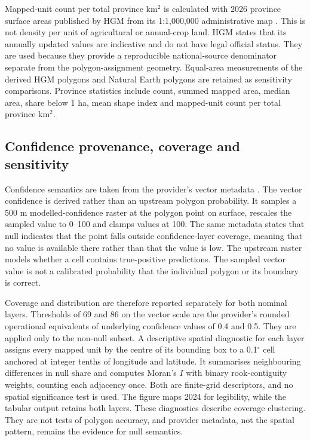 \documentclass[pdflatex,sn-basic]{sn-jnl}
\begin{document}
Mapped-unit count per total province km$^{2}$ is calculated with 2026 province surface areas published by HGM from its 1:1,000,000 administrative map \citep{harita_genel_mudurlugu_il_2026}. This is not density per unit of agricultural or annual-crop land. HGM states that its annually updated values are indicative and do not have legal official status. They are used because they provide a reproducible national-source denominator separate from the polygon-assignment geometry. Equal-area measurements of the derived HGM polygons and Natural Earth polygons are retained as sensitivity comparisons. Province statistics include count, summed mapped area, median area, share below 1 ha, mean shape index and mapped-unit count per total province km$^{2}$.

\subsection{Confidence provenance, coverage and sensitivity}\label{subsec:confidence-methods}

Confidence semantics are taken from the provider's vector metadata \citep{fields_of_the_world_global_2026-1}. The vector confidence is derived rather than an upstream polygon probability. It samples a 500 m modelled-confidence raster at the polygon point on surface, rescales the sampled value to 0--100 and clamps values at 100. The same metadata states that null indicates that the point falls outside confidence-layer coverage, meaning that no value is available there rather than that the value is low. The upstream raster models whether a cell contains true-positive predictions. The sampled vector value is not a calibrated probability that the individual polygon or its boundary is correct.

Coverage and distribution are therefore reported separately for both nominal layers. Thresholds of 69 and 86 on the vector scale are the provider's rounded operational equivalents of underlying confidence values of 0.4 and 0.5. They are applied only to the non-null subset. A descriptive spatial diagnostic for each layer assigns every mapped unit by the centre of its bounding box to a 0.1$^{\circ}$ cell anchored at integer tenths of longitude and latitude. It summarises neighbouring differences in null share and computes Moran's $I$ with binary rook-contiguity weights, counting each adjacency once. Both are finite-grid descriptors, and no spatial significance test is used. The figure maps 2024 for legibility, while the tabular output retains both layers. These diagnostics describe coverage clustering. They are not tests of polygon accuracy, and provider metadata, not the spatial pattern, remains the evidence for null semantics.
\end{document}
